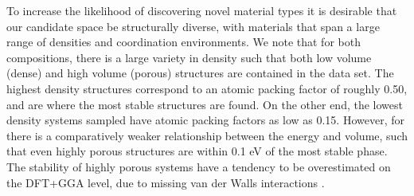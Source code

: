 To increase the likelihood of discovering novel material types it is desirable that our candidate space be structurally diverse, with materials that span a large range of densities and coordination environments.
%
We note that for both compositions, there is a large variety in density such that both low volume (dense) and high volume (porous) structures are contained in the data set.
%
The highest density structures correspond to an atomic packing factor of roughly 0.50, and are where the most stable structures are found.
%
On the other end, the lowest density systems sampled have atomic packing factors as low as 0.15.
%
However, for \IrOthree there is a comparatively weaker relationship between the energy and volume,
such that even highly porous structures are within 0.1 eV of the most stable phase.
%
The stability of highly porous systems have a tendency to be overestimated on the DFT+GGA level, due to missing van der Walls interactions \cite{}.
%
%
%
%


